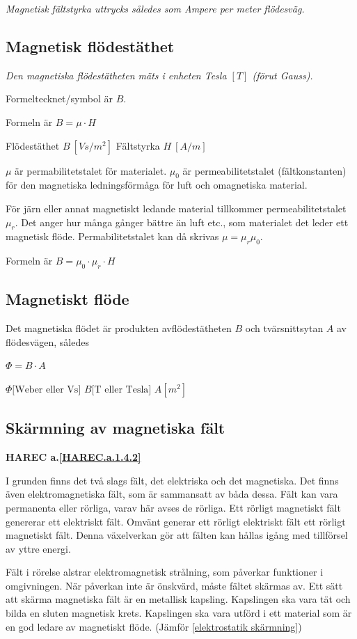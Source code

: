 \emph{Magnetisk fältstyrka uttrycks således som Ampere per meter flödesväg.}

\subsection{Magnetisk flödestäthet}

\emph{Den magnetiska flödestätheten mäts i enheten Tesla \([T]\) (förut Gauss).}

Formeltecknet/symbol är \(B\).

Formeln är \(B = \mu \cdot H\)

Flödestäthet \(B\ [Vs/m^2]\) Fältstyrka \(H\ [A/m]\)

\(\mu\) är permabilitetstalet för materialet.
\(\mu_0\) är permeabilitetstalet (fältkonstanten) för den magnetiska
ledningsförmåga för luft och omagnetiska material.

För järn eller annat magnetiskt ledande material tillkommer permeabilitetstalet
\(\mu_r\). Det anger hur många gånger bättre än luft etc., som materialet det
leder ett magnetisk flöde. Permabilitetstalet kan då skrivas
\(\mu = \mu_r\mu_0\).

Formeln är \(B = \mu_0 \cdot \mu_r \cdot H\)

\subsection{Magnetiskt flöde}

Det magnetiska flödet är produkten avflödestätheten \(B\) och tvärsnittsytan
\(A\) av flödesvägen, således

\(\Phi = B \cdot A\)

\(\Phi \text{[Weber eller Vs]}\) \(B \text{[T eller Tesla]}\) \(A [m^2]\)

\subsection{Skärmning av magnetiska fält}
\textbf{HAREC a.\ref{HAREC.a.1.4.2}\label{myHAREC.a.1.4.2}}
\label{elektromagnetisk skärmning}

I grunden finns det två slags fält, det elektriska och det magnetiska. Det
finns även elektromagnetiska fält, som är sammansatt av båda dessa. Fält kan
vara permanenta eller rörliga, varav här avses de rörliga. Ett rörligt
magnetiskt fält genererar ett elektriskt fält. Omvänt generar ett rörligt
elektriskt fält ett rörligt magnetiskt fält. Denna växelverkan gör att fälten
kan hållas igång med tillförsel av yttre energi.

Fält i rörelse alstrar elektromagnetisk strålning, som påverkar funktioner i
omgivningen. När påverkan inte är önskvärd, måste fältet skärmas av. Ett sätt
att skärma magnetiska fält är en metallisk kapsling. Kapslingen ska vara tät
och bilda en sluten magnetisk krets. Kapslingen ska vara utförd i ett
material som är en god ledare av magnetiskt flöde.
(Jämför \ref{elektrostatik skärmning})
